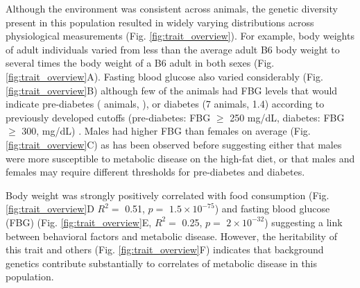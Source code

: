 \documentclass[
]{article}
\begin{document}
Although the environment was consistent across animals, the genetic
diversity present in this population resulted in widely varying
distributions across physiological measurements (Fig.
\ref{fig:trait_overview}). For example, body weights of adult
individuals varied from less than the average adult B6 body weight to
several times the body weight of a B6 adult in both sexes (Fig.
\ref{fig:trait_overview}A). Fasting blood glucose also varied
considerably (Fig. \ref{fig:trait_overview}B) although few of the
animals had FBG levels that would indicate pre-diabetes ( animals, ), or
diabetes (7 animals, 1.4) according to previously developed cutoffs
(pre-diabetes: FBG \(\geq\) 250 mg/dL, diabetes: FBG \(\geq\) 300,
mg/dL) \cite{pmid17018838}. Males had higher FBG than females on average
(Fig. \ref{fig:trait_overview}C) as has been observed before suggesting
either that males were more susceptible to metabolic disease on the
high-fat diet, or that males and females may require different
thresholds for pre-diabetes and diabetes.

Body weight was strongly positively correlated with food consumption
(Fig. \ref{fig:trait_overview}D \(R^2 =\) 0.51, \(p=\)
\ensuremath{1.5\times 10^{-75}}) and fasting blood glucose (FBG) (Fig.
\ref{fig:trait_overview}E, \(R^2=\) 0.25, \(p =\)
\ensuremath{2\times 10^{-32}}) suggesting a link between behavioral
factors and metabolic disease. However, the heritability of this trait
and others (Fig. \ref{fig:trait_overview}F) indicates that background
genetics contribute substantially to correlates of metabolic disease in
this population.
\end{document}
